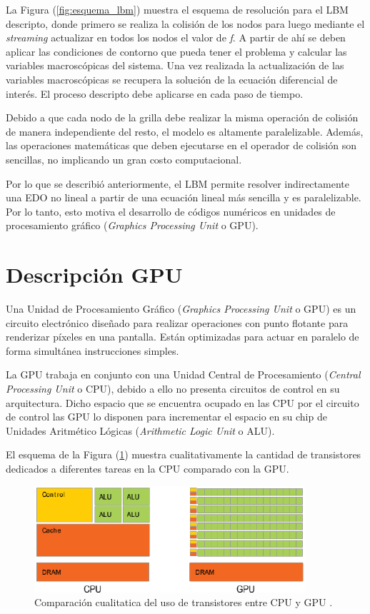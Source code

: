 La Figura (\ref{fig:esquema_lbm}) muestra el esquema de resolución para el LBM descripto, donde primero se realiza la colisión de los nodos para luego mediante el \textit{streaming} actualizar en todos los nodos el valor de \textit{f}. A partir de ahí se deben aplicar las condiciones de contorno que pueda tener el problema y calcular las variables macroscópicas del sistema. Una vez realizada la actualización de las variables macroscópicas se recupera la solución de la ecuación diferencial de interés. El proceso descripto debe aplicarse en cada paso de tiempo.

Debido a que cada nodo de la grilla debe realizar la misma operación de colisión de manera independiente del resto, el modelo es altamente paralelizable. Además, las operaciones matemáticas que deben ejecutarse en el operador de colisión son sencillas, no implicando un gran costo computacional.

Por lo que se describió anteriormente, el LBM permite resolver indirectamente una EDO no lineal a partir de una ecuación lineal más sencilla y es paralelizable. Por lo tanto, esto motiva el desarrollo de códigos numéricos en unidades de procesamiento gráfico (\textit{Graphics Processing Unit} o GPU).
\newpage
\section{Descripción GPU}

Una Unidad de Procesamiento Gráfico (\textit{Graphics Processing Unit} o GPU) es un  circuito electrónico diseñado para realizar operaciones con punto flotante para renderizar píxeles en una pantalla. Están optimizadas para actuar en paralelo de forma simultánea instrucciones simples.

La GPU trabaja en conjunto con una Unidad Central de Procesamiento (\textit{Central Processing Unit} o CPU), debido a ello no presenta circuitos de control en su arquitectura. Dicho espacio que se encuentra ocupado en las CPU por el circuito de control las GPU lo disponen para incrementar el espacio en su chip de Unidades Aritmético Lógicas (\textit{Arithmetic Logic Unit} o ALU).

El esquema de la Figura (\ref{fig:cpu_gpu_transis}) muestra cualitativamente la cantidad de transistores dedicados a diferentes tareas en la CPU comparado con la GPU.

\begin{figure}[h!]
	\centering
	\includegraphics[width=10cm]{cpu_gpu.png}
	\caption{Comparación cualitatica del uso de transistores entre CPU y GPU \cite{rinaldi2011modelos}.}
	\label{fig:cpu_gpu_transis}
\end{figure}

